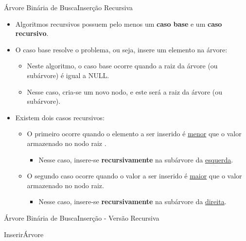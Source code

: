 \documentclass[aspectratio=169]{beamer}
\begin{document}

\begin{frame}{Árvore Binária de Busca}{Inserção Recursiva}
\begin{itemize}
 \item Algoritmos recursivos possuem pelo menos um {\bf caso base} e um {\bf caso recursivo}.
 \item O caso base resolve o problema, ou seja, insere um elemento na árvore:
 \begin{itemize}
 \item Neste algoritmo, o caso base ocorre quando a raiz da árvore (ou subárvore) é igual a NULL.
 \item Nesse caso, cria-se um novo nodo, e este será a raiz da árvore (ou subárvore).
 \end{itemize}
 \item Existem dois casos recursivos:
 \begin{itemize}
 \item O primeiro ocorre quando o elemento a ser inserido é \underline{menor} que o valor armazenado no nodo raiz .
 \begin{itemize}
 \item Nesse caso, insere-se {\bf recursivamente} na subárvore da \underline{esquerda}.
 \end{itemize}
 \item O segundo caso ocorre quando o valor a ser inserido é \underline{maior} que o valor armazenado no nodo raiz.
 \begin{itemize}
 \item Nesse caso, insere-se {\bf recursivamente} na subárvore da \underline{direita}.
 \end{itemize} 
 \end{itemize}
\end{itemize}
\end{frame}




\begin{frame}{Árvore Binária de Busca}{Inserção - Versão Recursiva}
\begin{algorithm}[H]
\caption{InserirÁrvore} 
\label{Inserir_arvore_recursivo}
\end{algorithm}
\end{frame}
\end{document}
